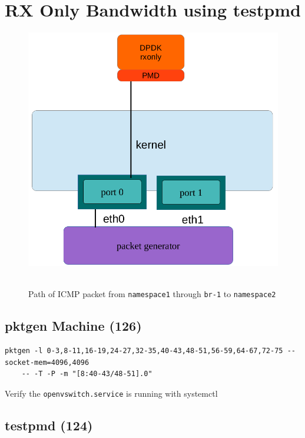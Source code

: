 \documentclass[letter]{article}
\begin{document}
\section{RX Only Bandwidth using testpmd}
{\setlength{\parindent}{0cm}

\begin{figure}[H]
\caption{Path of ICMP packet from \texttt{namespace1} through \texttt{br-1} to \texttt{namespace2}}
\hbox{\includegraphics{rx-only} }
\end{figure}

\subsection{pktgen Machine (126)}

\begin{lstlisting}
pktgen -l 0-3,8-11,16-19,24-27,32-35,40-43,48-51,56-59,64-67,72-75 --socket-mem=4096,4096 
	-- -T -P -m "[8:40-43/48-51].0"
\end{lstlisting}

Verify the \texttt{openvswitch.service} is running with systemctl

\subsection{testpmd (124)}

}
\end{document}
